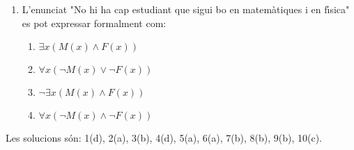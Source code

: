 \begin{enumerate}
\begin{enumerate}
\item Reducci\'{o} a l'absurd.

\item Sil\textperiodcentered logisme disjuntiu.
\end{enumerate}

\item L'enunciat "No hi ha cap estudiant que sigui bo en matem\`{a}tiques i en
f\'{\i}sica" es pot expressar formalment com:

\begin{enumerate}
\item $\exists x(M(x)\wedge F(x))$

\item $\forall x(\lnot M(x)\vee\lnot F(x))$

\item $\lnot\exists x(M(x)\wedge F(x))$

\item $\forall x(\lnot M(x)\wedge\lnot F(x))$
\end{enumerate}
\end{enumerate}

\bigskip

Les solucions s\'{o}n: 1(d), 2(a), 3(b), 4(d), 5(a), 6(a), 7(b), 8(b), 9(b), 10(c).